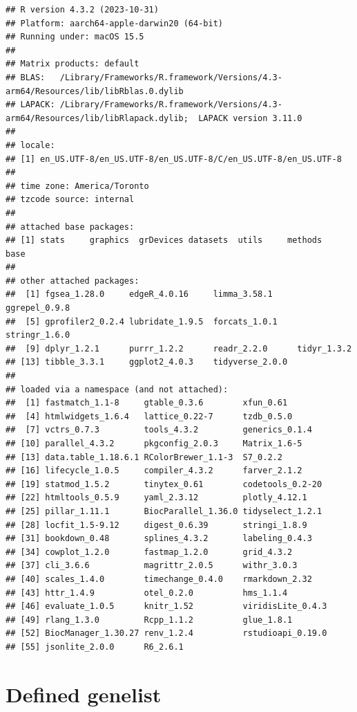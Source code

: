 \documentclass[
]{book}
\begin{document}
\begin{verbatim}
## R version 4.3.2 (2023-10-31)
## Platform: aarch64-apple-darwin20 (64-bit)
## Running under: macOS 15.5
## 
## Matrix products: default
## BLAS:   /Library/Frameworks/R.framework/Versions/4.3-arm64/Resources/lib/libRblas.0.dylib 
## LAPACK: /Library/Frameworks/R.framework/Versions/4.3-arm64/Resources/lib/libRlapack.dylib;  LAPACK version 3.11.0
## 
## locale:
## [1] en_US.UTF-8/en_US.UTF-8/en_US.UTF-8/C/en_US.UTF-8/en_US.UTF-8
## 
## time zone: America/Toronto
## tzcode source: internal
## 
## attached base packages:
## [1] stats     graphics  grDevices datasets  utils     methods   base     
## 
## other attached packages:
##  [1] fgsea_1.28.0     edgeR_4.0.16     limma_3.58.1     ggrepel_0.9.8   
##  [5] gprofiler2_0.2.4 lubridate_1.9.5  forcats_1.0.1    stringr_1.6.0   
##  [9] dplyr_1.2.1      purrr_1.2.2      readr_2.2.0      tidyr_1.3.2     
## [13] tibble_3.3.1     ggplot2_4.0.3    tidyverse_2.0.0 
## 
## loaded via a namespace (and not attached):
##  [1] fastmatch_1.1-8     gtable_0.3.6        xfun_0.61          
##  [4] htmlwidgets_1.6.4   lattice_0.22-7      tzdb_0.5.0         
##  [7] vctrs_0.7.3         tools_4.3.2         generics_0.1.4     
## [10] parallel_4.3.2      pkgconfig_2.0.3     Matrix_1.6-5       
## [13] data.table_1.18.6.1 RColorBrewer_1.1-3  S7_0.2.2           
## [16] lifecycle_1.0.5     compiler_4.3.2      farver_2.1.2       
## [19] statmod_1.5.2       tinytex_0.61        codetools_0.2-20   
## [22] htmltools_0.5.9     yaml_2.3.12         plotly_4.12.1      
## [25] pillar_1.11.1       BiocParallel_1.36.0 tidyselect_1.2.1   
## [28] locfit_1.5-9.12     digest_0.6.39       stringi_1.8.9      
## [31] bookdown_0.48       splines_4.3.2       labeling_0.4.3     
## [34] cowplot_1.2.0       fastmap_1.2.0       grid_4.3.2         
## [37] cli_3.6.6           magrittr_2.0.5      withr_3.0.3        
## [40] scales_1.4.0        timechange_0.4.0    rmarkdown_2.32     
## [43] httr_1.4.9          otel_0.2.0          hms_1.1.4          
## [46] evaluate_1.0.5      knitr_1.52          viridisLite_0.4.3  
## [49] rlang_1.3.0         Rcpp_1.1.2          glue_1.8.1         
## [52] BiocManager_1.30.27 renv_1.2.4          rstudioapi_0.19.0  
## [55] jsonlite_2.0.0      R6_2.6.1
\end{verbatim}

\chapter*{Defined genelist}\label{defined-genelist}
\end{document}
